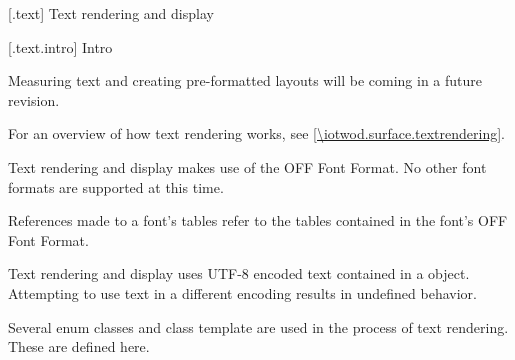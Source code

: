 
 [\iotwod.text] {Text rendering and display}

 [\iotwod.text.intro] {Intro}

\pnum
\begin{note}
Measuring text and creating pre-formatted layouts will be coming in a future revision.
\end{note}

\pnum
For an overview of how text rendering works, see \ref{\iotwod.surface.textrendering}.

\pnum
Text rendering and display makes use of the OFF Font Format. No other font formats are supported at this time.

\pnum
References made to a font's tables refer to the tables contained in the font's OFF Font Format.

\pnum
Text rendering and display uses UTF-8 encoded text contained in a  object. Attempting to use text in a different encoding results in undefined behavior.

\pnum
Several enum classes and class template are used in the process of text rendering. These are defined here.

\addtocounter{SectionDepthBase}{1}



%








\addtocounter{SectionDepthBase}{-1}
